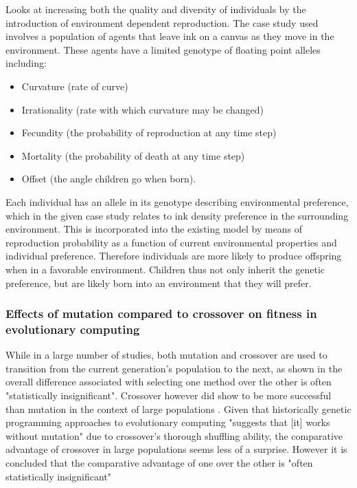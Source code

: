 \documentclass[10pt,a4paper]{article}
\begin{document}
Looks at increasing both the quality and diversity of individuals by the introduction of environment dependent reproduction.
The case study used involves a population of agents that leave ink on a canvas as they move in the environment.
These agents have a limited genotype of floating point alleles including: 
\begin{itemize}
	\item Curvature (rate of curve)
	\item Irrationality (rate with which curvature may be changed)
	\item Fecundity (the probability of reproduction at any time step)
	\item Mortality (the probability of death at any time step)
	\item Offset (the angle children go when born).
\end{itemize}
Each individual has an allele in its genotype describing environmental preference, which in the given case study relates to ink density preference in the surrounding environment.
This is incorporated into the existing model by means of reproduction probability as a function of current environmental properties and individual preference.
Therefore individuals are more likely to produce offspring when in a favorable environment. 
Children thus not only inherit the genetic preference, but are likely born into an environment that they will prefer.

\subsubsection{Effects of mutation compared to crossover on fitness in evolutionary computing}

While in a large number of studies, both mutation and crossover are used to transition from the current generation's population to the next, as shown in \cite{mutation-vs-crossover, mutation-vs-crossover-revised} the overall difference associated with selecting one method over the other is often "statistically insignificant".
Crossover however did show to be more successful than mutation in the context of large populations \cite{mutation-vs-crossover-revised}.
Given that historically genetic programming approaches to evolutionary computing "suggests that [it] works without mutation" \cite[p.~77]{intro-to-evolutionary-computing} due to crossover's thorough shuffling ability, the comparative advantage of crossover in large populations seems less of a surprise.
However it is concluded that the comparative advantage of one over the other is "often statistically insignificant" \cite[p.~3]{mutation-vs-crossover-revised} 
\end{document}
